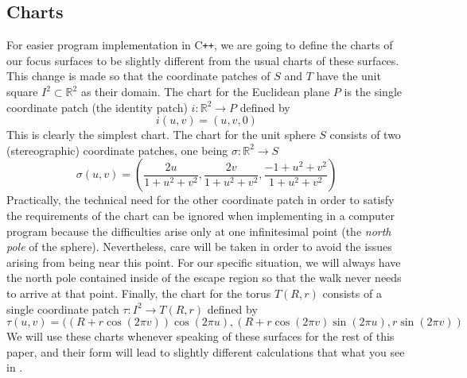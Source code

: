 \documentclass{article}
\newcommand{\R}{\mathbb{R}}
\begin{document}
	\subsection{Charts}
		For easier program implementation in C\texttt{++}, we are going to define the charts of our focus surfaces to be slightly different from the usual charts of these surfaces.
		This change is made so that the coordinate patches of $S$ and $T$ have the unit square $I^2 \subset \R^2$ as their domain.
		The chart for the Euclidean plane $P$ is the single coordinate patch (the identity patch) $i: \R^2 \to P$ defined by
		$$ i(u,v) = ( u , v , 0 ) $$
		This is clearly the simplest chart.
		The chart for the unit sphere $S$ consists of two (stereographic) coordinate patches, one being $\sigma:\R^2 \to S$
		$$ \sigma(u,v) = \left( \frac{2u}{1+u^2+v^2} , \frac{2v}{1+u^2+v^2} , \frac{-1+u^2+v^2}{1+u^2+v^2} \right) $$
		Practically, the technical need for the other coordinate patch in order to satisfy the requirements of the chart can be ignored when implementing in a computer program because the difficulties arise only at one infinitesimal point (the \textit{north pole} of the sphere).
		Nevertheless, care will be taken in order to avoid the issues arising from being near this point.
		For our specific situation, we will always have the north pole contained inside of the escape region so that the walk never needs to arrive at that point. 
		Finally, the chart for the torus $T(R,r)$ consists of a single coordinate patch $\tau:I^2 \to T(R,r)$ defined by
		$$ \tau(u,v) = ( (R+r\cos(2\pi v))\cos(2\pi u) , (R+r\cos(2\pi v)\sin(2\pi u) , r\sin(2\pi v) ) $$
		We will use these charts whenever speaking of these surfaces for the rest of this paper, and their form will lead to slightly different calculations that what you see in \cite{BanchoffLovett_DiffGeo_2010,Irons_GeodesicsTorus_2005}.
		
\end{document}
